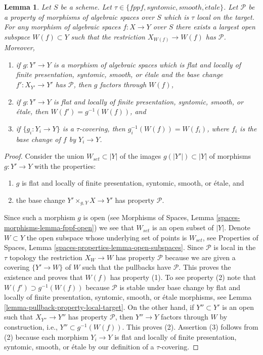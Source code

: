 \documentclass[10pt,a4paper]{amsart}
\theoremstyle{plain}
\newtheorem{lemma}[subsection]{Lemma}
\theoremstyle{definition}
\theoremstyle{remark}
\numberwithin{equation}{subsection}
\def\etale{{\acute{e}tale}}
\begin{document}
\begin{lemma}
\label{lemma-largest-open-of-the-base}
Let $S$ be a scheme.
Let $\tau \in \{fppf, syntomic, smooth, \etale\}$.
Let $\mathcal{P}$ be a property of morphisms of algebraic spaces over $S$
which is $\tau$ local on the target. For any morphism of algebraic spaces
$f : X \to Y$ over $S$ there exists a largest open subspace
$W(f) \subset Y$ such that the restriction $X_{W(f)} \to W(f)$ has
$\mathcal{P}$. Moreover,
\begin{enumerate}
\item if $g : Y' \to Y$ is a morphism of algebraic spaces which is
flat and locally of finite presentation, syntomic, smooth, or \'etale
and the base change $f' : X_{Y'} \to Y'$ has $\mathcal{P}$, then
$g$ factors through $W(f)$,
\item if $g : Y' \to Y$ is flat and locally of finite presentation,
syntomic, smooth, or \'etale, then $W(f') = g^{-1}(W(f))$, and
\item if $\{g_i : Y_i \to Y\}$ is a $\tau$-covering, then
$g_i^{-1}(W(f)) = W(f_i)$, where $f_i$ is the base change of $f$
by $Y_i \to Y$.
\end{enumerate}
\end{lemma}

\begin{proof}
Consider the union $W_{set} \subset |Y|$ of the images
$g(|Y'|) \subset |Y|$ of morphisms $g : Y' \to Y$ with the properties:
\begin{enumerate}
\item $g$ is flat and locally of finite presentation, syntomic,
smooth, or \'etale, and
\item the base change $Y' \times_{g, Y} X \to Y'$ has property
$\mathcal{P}$.
\end{enumerate}
Since such a morphism $g$ is open (see
Morphisms of Spaces, Lemma \ref{spaces-morphisms-lemma-fppf-open})
we see that $W_{set}$ is an open subset of $|Y|$. Denote $W \subset Y$
the open subspace whose underlying set of points is $W_{set}$, see
Properties of Spaces, Lemma \ref{spaces-properties-lemma-open-subspaces}.
Since $\mathcal{P}$ is local in the $\tau$ topology the restriction
$X_W \to W$ has property $\mathcal{P}$ because we are given a covering
$\{Y' \to W\}$ of $W$ such that the pullbacks have $\mathcal{P}$.
This proves the existence and proves that $W(f)$ has property (1).
To see property (2) note that $W(f') \supset g^{-1}(W(f))$ because
$\mathcal{P}$ is stable under base change by flat and locally of finite
presentation, syntomic, smooth, or \'etale morphisms, see
Lemma \ref{lemma-pullback-property-local-target}.
On the other hand, if $Y'' \subset Y'$ is an open such that
$X_{Y''} \to Y''$ has property $\mathcal{P}$, then $Y'' \to Y$ factors
through $W$ by construction, i.e., $Y'' \subset g^{-1}(W(f))$. This
proves (2). Assertion (3) follows from (2) because each morphism
$Y_i \to Y$ is flat and locally of finite presentation, syntomic,
smooth, or \'etale by our definition of a $\tau$-covering.
\end{proof}
\end{document}
